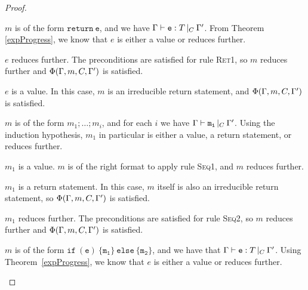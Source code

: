 \documentclass[a4paper]{article}
\theoremstyle{definition}
\theoremstyle{dotless}
\begin{document}
\begin{proof}
\begin{case}[RetTypable1]
  \end{case}

  \begin{case}\label{retTypable}

  	$m$ is of the form $\mathtt{return\ e}$, and we have $\Gamma{}\vdash\mathtt{e}: T\,|_C\:\Gamma'$. From
  	Theorem \ref{expProgress}, we know that $e$ is either a value or reduces
  	further.

  	\begin{subcase}
  	  $e$ reduces further.
  	  The preconditions are satisfied for rule \textsc{Ret1}, so $m$ reduces
  	  further and $\Phi(\Gamma, m, C, \Gamma')$ is satisfied.  
  	\end{subcase}

  	\begin{subcase}
  	  $e$ is a value.
  	  In this case, $m$ is an irreducible return statement, and $\Phi(\Gamma, m, C, \Gamma')$ is
  	  satisfied.
	\end{subcase}  

  \end{case}

  \begin{case}[SeqTypable]\label{seqtypable}

	$m$ is of the form $m_1; \dots; m_i$, and for each $i$ we have
	$\Gamma{}\vdash\mathtt{m_i}\, |_C \:\Gamma '$. Using the induction hypothesis, $m_1$ in particular is
	either a value, a return statement, or reduces further.

	\begin{subcase}
	  $m_1$ is a value.
	  $m$ is of the right format to apply rule \textsc{Seq1}, and $m$ reduces
	  further. 
	\end{subcase}

	\begin{subcase}
	  $m_1$ is a return statement.
	  In this case, $m$ itself is also an irreducible return statement, so
	  $\Phi(\Gamma, m, C, \Gamma')$ is satisfied. 
	\end{subcase}

	\begin{subcase}
	  $m_1$ reduces further.
	  The preconditions are satisfied for rule \textsc{Seq2}, so $m$ reduces
	  further and $\Phi(\Gamma, m, C, \Gamma')$ is satisfied.
	\end{subcase}

  \end{case}

  \begin{case}[IfTypable]\label{iftypable}

	$m$ is of the form $\mathtt{if\ (e)\ \{m_1\}\ else\ \{m_2\}}$, and we have
	that $\Gamma{}\vdash\mathtt{e}: T\,|_C\:\Gamma'$. Using Theorem~\ref{expProgress}, we know that $e$ is
	either a value or reduces further.


\end{case}
\end{proof}
\end{document}
